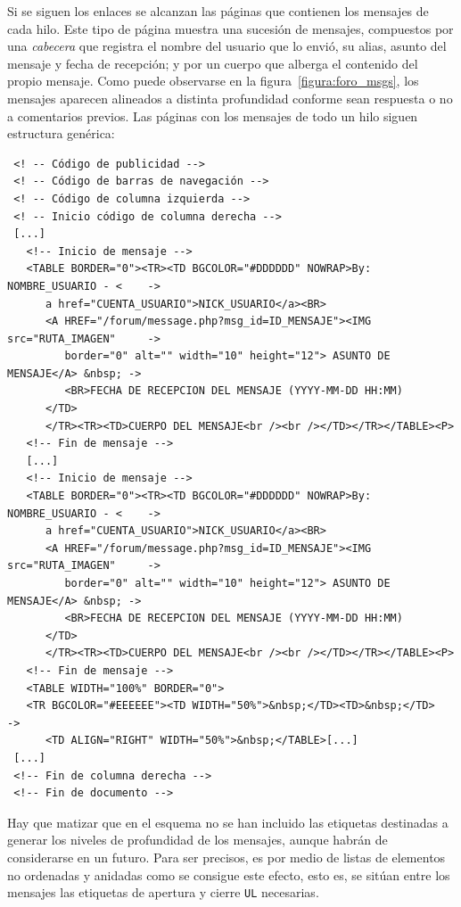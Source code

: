 Si se siguen los enlaces se alcanzan las páginas que
contienen los mensajes de cada hilo. Este tipo de página muestra una sucesión
de mensajes, compuestos por una \textit{cabecera} que registra el nombre del
usuario que lo envió, su alias, asunto del mensaje y fecha de recepción; y por
un cuerpo que alberga el contenido del propio mensaje. Como puede observarse
en la figura~\ref{figura:foro_msgs}, los mensajes aparecen alineados a distinta
profundidad conforme sean respuesta o no a comentarios previos.
Las páginas con los mensajes de todo un hilo siguen estructura genérica:

{\scriptsize
\begin{verbatim}
 <! -- Código de publicidad -->
 <! -- Código de barras de navegación -->
 <! -- Código de columna izquierda -->
 <! -- Inicio código de columna derecha -->
 [...]
   <!-- Inicio de mensaje -->
   <TABLE BORDER="0"><TR><TD BGCOLOR="#DDDDDD" NOWRAP>By: NOMBRE_USUARIO - <    ->
      a href="CUENTA_USUARIO">NICK_USUARIO</a><BR>
      <A HREF="/forum/message.php?msg_id=ID_MENSAJE"><IMG src="RUTA_IMAGEN"     ->
         border="0" alt="" width="10" height="12"> ASUNTO DE MENSAJE</A> &nbsp; ->
         <BR>FECHA DE RECEPCION DEL MENSAJE (YYYY-MM-DD HH:MM)
      </TD>
      </TR><TR><TD>CUERPO DEL MENSAJE<br /><br /></TD></TR></TABLE><P>
   <!-- Fin de mensaje -->
   [...]
   <!-- Inicio de mensaje -->
   <TABLE BORDER="0"><TR><TD BGCOLOR="#DDDDDD" NOWRAP>By: NOMBRE_USUARIO - <    ->
      a href="CUENTA_USUARIO">NICK_USUARIO</a><BR>
      <A HREF="/forum/message.php?msg_id=ID_MENSAJE"><IMG src="RUTA_IMAGEN"     ->
         border="0" alt="" width="10" height="12"> ASUNTO DE MENSAJE</A> &nbsp; ->
         <BR>FECHA DE RECEPCION DEL MENSAJE (YYYY-MM-DD HH:MM)
      </TD>
      </TR><TR><TD>CUERPO DEL MENSAJE<br /><br /></TD></TR></TABLE><P>
   <!-- Fin de mensaje -->
   <TABLE WIDTH="100%" BORDER="0">
   <TR BGCOLOR="#EEEEEE"><TD WIDTH="50%">&nbsp;</TD><TD>&nbsp;</TD>             ->
      <TD ALIGN="RIGHT" WIDTH="50%">&nbsp;</TABLE>[...]
 [...]
 <!-- Fin de columna derecha -->
 <!-- Fin de documento -->
\end{verbatim}
}

Hay que matizar que en el esquema no se han incluido las etiquetas destinadas
a generar los niveles de profundidad de los mensajes, aunque habrán de
considerarse en un futuro. Para ser precisos, es por medio de listas de elementos
no ordenadas y anidadas como se consigue este efecto, esto es, se sitúan entre
los mensajes las etiquetas de apertura y cierre \texttt{UL} necesarias.

